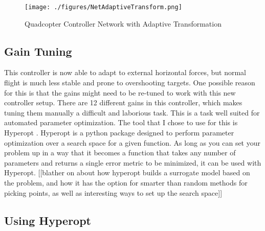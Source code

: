 \documentclass[letterpaper,12pt,titlepage,oneside,final]{book}
\begin{document}
\begin{figure}
\centering
\texttt{[image: ./figures/NetAdaptiveTransform.png]} %
\caption{Quadcopter Controller Network with Adaptive Transformation}
\label{fig:NetAdaptiveTransform}
\end{figure}


\subsection{Gain Tuning}

This controller is now able to adapt to external horizontal forces, but normal flight is much less stable and prone to overshooting targets. 
One possible reason for this is that the gains might need to be re-tuned to work with this new controller setup. 
There are 12 different gains in this controller, which makes tuning them manually a difficult and laborious task.
This is a task well suited for automated parameter optimization. 
The tool that I chose to use for this is Hyperopt \cite{bergstra2013hyperopt}. 
Hyperopt is a python package designed to perform parameter optimization over a search space for a given function. 
As long as you can set your problem up in a way that it becomes a function that takes any number of parameters and returns a single error metric to be minimized, it can be used with Hyperopt. [[blather on about how hyperopt builds a surrogate model based on the problem, and how it has the option for smarter than random methods for picking points, as well as interesting ways to set up the search space]]

\subsection{Using Hyperopt}
\end{document}
